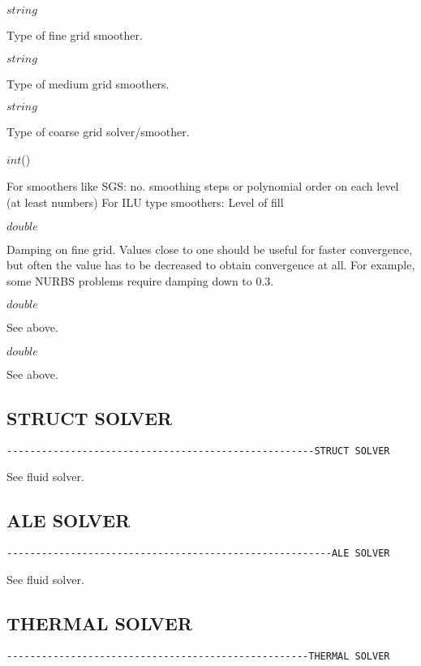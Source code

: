 \noindent{} $string$

Type of fine grid smoother.

\noindent{} $string$

Type of medium grid smoothers.

\noindent{} $string$

Type of coarse grid solver/smoother.

\noindent{} $int$()

For smoothers like SGS: no. smoothing steps or polynomial order on each level (at least  numbers)
For ILU type smoothers: Level of fill

\noindent{} $double$

Damping on fine grid. Values close to one should be useful for faster convergence, but often 
the value has to be decreased to obtain convergence at all.
For example, some NURBS problems require damping down to 0.3.

\noindent{} $double$

See above.

\noindent{} $double$

See above.

\subsection{STRUCT SOLVER}
\begin{verbatim}
-----------------------------------------------------STRUCT SOLVER
\end{verbatim}

See fluid solver.

\subsection{ALE SOLVER}
\begin{verbatim}
--------------------------------------------------------ALE SOLVER
\end{verbatim}

See fluid solver.

\subsection{THERMAL SOLVER}
\begin{verbatim}
----------------------------------------------------THERMAL SOLVER
\end{verbatim}

